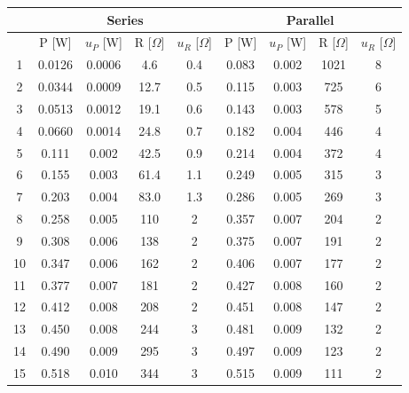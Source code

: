 \documentclass{article}
\begin{document}
{\begin{table}[H]
\centering
\begin{tabular}{@{}c|cc|cc||cc|cc@{}}
\toprule
 \multicolumn{1}{l}{}  & \multicolumn{4}{c||}{Series}                       & \multicolumn{4}{c}{Parallel}                    \\ \midrule
 \multicolumn{1}{l}{}  & P [W]  & $u_P$ [W] & R [$\Omega$] & $u_R$ [$\Omega$] & P [W] & $u_P$ [W] & R [$\Omega$] & $u_R$ [$\Omega$] \\ \midrule
1  & 0.0126 & 0.0006  & 4.6          & 0.4            & 0.083 & 0.002   & 1021         & 8              \\
2  & 0.0344 & 0.0009  & 12.7         & 0.5            & 0.115 & 0.003   & 725          & 6              \\
3  & 0.0513 & 0.0012  & 19.1         & 0.6            & 0.143 & 0.003   & 578          & 5              \\
4  & 0.0660 & 0.0014  & 24.8         & 0.7            & 0.182 & 0.004   & 446          & 4              \\
5  & 0.111  & 0.002   & 42.5         & 0.9            & 0.214 & 0.004   & 372          & 4              \\
6  & 0.155  & 0.003   & 61.4         & 1.1            & 0.249 & 0.005   & 315          & 3              \\
7  & 0.203  & 0.004   & 83.0         & 1.3            & 0.286 & 0.005   & 269          & 3              \\
8  & 0.258  & 0.005   & 110          & 2              & 0.357 & 0.007   & 204          & 2              \\
9  & 0.308  & 0.006   & 138          & 2              & 0.375 & 0.007   & 191          & 2              \\
10 & 0.347  & 0.006   & 162          & 2              & 0.406 & 0.007   & 177          & 2              \\
11 & 0.377  & 0.007   & 181          & 2              & 0.427 & 0.008   & 160          & 2              \\
12 & 0.412  & 0.008   & 208          & 2              & 0.451 & 0.008   & 147          & 2              \\
13 & 0.450  & 0.008   & 244          & 3              & 0.481 & 0.009   & 132          & 2              \\
14 & 0.490  & 0.009   & 295          & 3              & 0.497 & 0.009   & 123          & 2              \\
15 & 0.518  & 0.010   & 344          & 3              & 0.515 & 0.009   & 111          & 2              \\

\end{tabular}
\end{table}}
\end{document}
